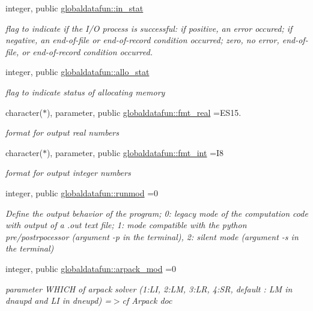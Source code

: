 \begin{DoxyCompactItemize}
integer, public \hyperlink{namespaceglobaldatafun_a64c0718f56f06c9fe3cfb49b0dc5ced0}{globaldatafun\+::in\+\_\+stat}
\begin{DoxyCompactList}\small\item\em flag to indicate if the I/O process is successful\+: if positive, an error occured; if negative, an end-\/of-\/file or end-\/of-\/record condition occurred; zero, no error, end-\/of-\/file, or end-\/of-\/record condition occurred. \end{DoxyCompactList}\item 
integer, public \hyperlink{namespaceglobaldatafun_ac0c29e0202eb23daead1a4fcecc645ea}{globaldatafun\+::allo\+\_\+stat}
\begin{DoxyCompactList}\small\item\em flag to indicate status of allocating memory \end{DoxyCompactList}\item 
character($\ast$), parameter, public \hyperlink{namespaceglobaldatafun_ab9b7950cc6b98bba6c90ccbc0bf16763}{globaldatafun\+::fmt\+\_\+real} =\textquotesingle{}E\+S15.\textquotesingle{}
\begin{DoxyCompactList}\small\item\em format for output real numbers \end{DoxyCompactList}\item 
character($\ast$), parameter, public \hyperlink{namespaceglobaldatafun_a9636e338fbbaf3b710c9483f5ba825ad}{globaldatafun\+::fmt\+\_\+int} =\textquotesingle{}I8\textquotesingle{}
\begin{DoxyCompactList}\small\item\em format for output integer numbers \end{DoxyCompactList}\item 
integer, public \hyperlink{namespaceglobaldatafun_a69fb7d8f3bbcc95ea17d1f924b50fbfa}{globaldatafun\+::runmod} =0
\begin{DoxyCompactList}\small\item\em Define the output behavior of the program; 0\+: legacy mode of the computation code with output of a .out text file; 1\+: mode compatible with the python pre/postrpocessor (argument -\/p in the terminal), 2\+: silent mode (argument -\/s in the terminal) \end{DoxyCompactList}\item 
integer, public \hyperlink{namespaceglobaldatafun_ac1ee1084ba0c21ae53df281847753757}{globaldatafun\+::arpack\+\_\+mod} =0
\begin{DoxyCompactList}\small\item\em parameter W\+H\+I\+CH of arpack solver (1\+:LI, 2\+:LM, 3\+:LR, 4\+:SR, default \+: LM in dnaupd and LI in dneupd) =$>$cf Arpack doc \end{DoxyCompactList}\item 

\end{DoxyCompactItemize}

